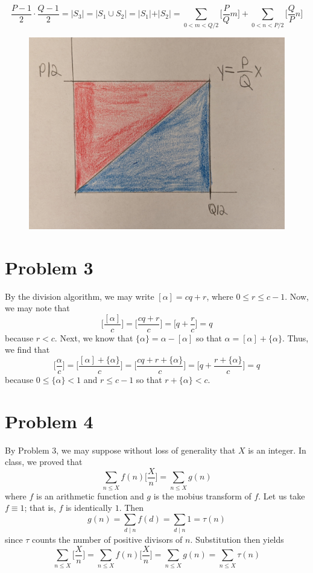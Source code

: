 \documentclass[12pt]{article}
\begin{document}
\[
\frac{P-1}{2} \cdot \frac{Q-1}{2} = \vert S_3 \vert = \vert S_1 \cup S_2 \vert = \vert S_1 \vert + \vert S_2 \vert = \sum_{0<m<Q/2} \bigg[\frac{P}{Q}m \bigg] + \sum_{0<n<P/2} \bigg[\frac{Q}{P}n \bigg] 
\]
\begin{figure}[H]
\centering
\includegraphics[width=\textwidth]{Problem2Image1}
\end{figure} 
\newpage
\section*{Problem 3}
By the division algorithm, we may write $[\alpha] = cq + r$, where $0 \leq r \leq c-1$. Now, we may note that
\[
\bigg[ \frac{[\alpha]}{c}\bigg] = \bigg[ \frac{cq+r}{c}\bigg] = \bigg[ q+ \frac{r}{c} \bigg] = q
\] because $r < c$. Next, we know that $\{\alpha\} = \alpha - [\alpha]$ so that $\alpha = [\alpha] + \{\alpha\}$. Thus, we find that
\[
\bigg[\frac{\alpha}{c}\bigg] = \bigg[\frac{[\alpha] + \{\alpha\}}{c}\bigg] = \bigg[\frac{ cq + r + \{\alpha\}}{c}\bigg] = \bigg[ q + \frac{r+\{\alpha\}}{c}\bigg] = q
\] because $0 \leq \{\alpha\} < 1$ and $r \leq c - 1$ so that $r+\{\alpha\} < c$.
\newpage
\section*{Problem 4}
By Problem $3$, we may suppose without loss of generality that $X$ is an integer. In class, we proved that
\[
\sum_{n \leq X} f(n) \bigg[ \frac{X}{n} \bigg] = \sum_{n \leq X} g(n)
\] where $f$ is an arithmetic function and $g$ is the mobius transform of $f$. Let us take $f \equiv 1$; that is, $f$ is identically $1$. Then
\[
g(n) = \sum_{d\mid n} f(d) = \sum_{d\mid n} 1 = \tau(n)
\] since $\tau$ counts the number of positive divisors of $n$. Substitution then yields
\[
\sum_{n \leq X} \bigg[ \frac{X}{n} \bigg] = \sum_{n \leq X} f(n) \bigg[ \frac{X}{n} \bigg] = \sum_{n \leq X} g(n) = \sum_{n \leq X} \tau(n)
\] 
\newpage
\end{document}
